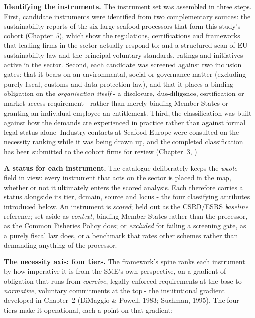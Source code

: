 \textbf{Identifying the instruments.} The instrument set was assembled in three
steps. First, candidate instruments were identified from two complementary
sources: the sustainability reports of the six large seafood processors that form
this study's cohort (Chapter~5), which show the regulations, certifications and
frameworks that leading firms in the sector actually respond to; and a structured
scan of EU sustainability law and the principal voluntary standards, ratings and
initiatives active in the sector. Second, each candidate was screened against two
inclusion gates: that it bears on an environmental, social or governance matter
(excluding purely fiscal, customs and data-protection law), and that it places a
binding obligation on the \emph{organisation itself} - a disclosure,
due-diligence, certification or market-access requirement - rather than merely
binding Member States or granting an individual employee an entitlement. Third,
the classification was built against how the demands are experienced in practice
rather than against formal legal status alone. Industry contacts at Seafood Europe
were consulted on the necessity ranking while it was being drawn up, and the
completed classification has been submitted to the cohort firms for review
(Chapter~3, ).

\textbf{A status for each instrument.} The catalogue deliberately keeps the
\emph{whole} field in view: every instrument that acts on the sector is placed in
the map, whether or not it ultimately enters the scored analysis. Each therefore
carries a status alongside its tier, domain, source and locus - the four
classifying attributes introduced below. An instrument is \emph{scored}; held out
as the CSRD/ESRS \emph{baseline} reference; set aside as \emph{context}, binding
Member States rather than the processor, as the Common Fisheries Policy does; or
\emph{excluded} for failing a screening gate, as a purely fiscal law does, or a
benchmark that rates other schemes rather than demanding anything of the
processor.

\textbf{The necessity axis: four tiers.} The framework's spine ranks each
instrument by how imperative it is from the SME's own perspective, on a gradient
of obligation that runs from \emph{coercive}, legally enforced requirements at the
base to \emph{normative}, voluntary commitments at the top - the institutional
gradient developed in Chapter~2 (DiMaggio \& Powell, 1983; Suchman, 1995). The
four tiers make it operational, each a point on that gradient:

